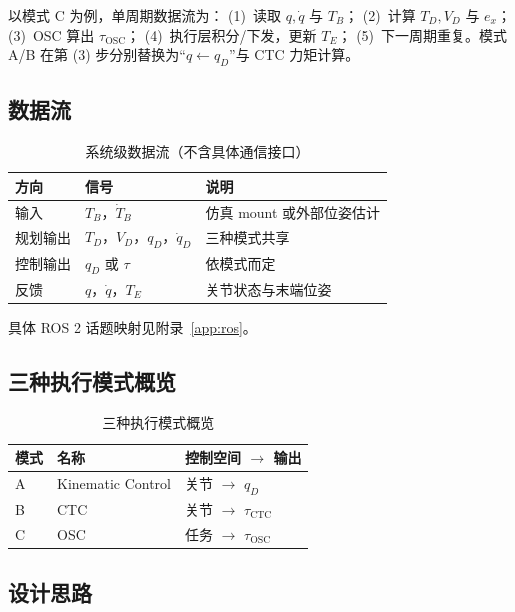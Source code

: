 \documentclass[UTF8, a4paper, 12pt]{ctexart}
\begin{document}
以模式 C 为例，单周期数据流为：
(1)~读取 $q,\dot{q}$ 与 $T_B$；
(2)~计算 $T_D,V_D$ 与 $e_x$；
(3)~OSC 算出 $\tau_{\mathrm{OSC}}$；
(4)~执行层积分/下发，更新 $T_E$；
(5)~下一周期重复。模式 A/B 在第 (3) 步分别替换为“$q\leftarrow q_D$”与 CTC 力矩计算。

\subsection{数据流}

\begin{table}[H]
  \centering
  \caption{系统级数据流（不含具体通信接口）}
  \label{tab:dataflow}
  \begin{tabular}{@{} l l l @{}}
    \toprule
    方向 & 信号 & 说明 \\
    \midrule
    输入 & $T_B$，$\dot{T}_B$ & 仿真 mount 或外部位姿估计 \\
    规划输出 & $T_D$，$V_D$，$q_D$，$\dot{q}_D$ & 三种模式共享 \\
    控制输出 & $q_D$ 或 $\tau$ & 依模式而定 \\
    反馈 & $q$，$\dot{q}$，$T_E$ & 关节状态与末端位姿 \\
    \bottomrule
  \end{tabular}
\end{table}

具体 ROS 2 话题映射见附录~\ref{app:ros}。

\subsection{三种执行模式概览}

\begin{table}[H]
  \centering
  \caption{三种执行模式概览}
  \label{tab:mode-overview}
  \begin{tabular}{@{} l l l @{}}
    \toprule
    模式 & 名称 & 控制空间 $\rightarrow$ 输出 \\
    \midrule
    A & Kinematic Control & 关节 $\rightarrow$ $q_D$ \\
    B & CTC & 关节 $\rightarrow$ $\tau_{\mathrm{CTC}}$ \\
    C & OSC & 任务 $\rightarrow$ $\tau_{\mathrm{OSC}}$ \\
    \bottomrule
  \end{tabular}
\end{table}

\subsection{设计思路}
\label{sec:design-rationale}
\end{document}
